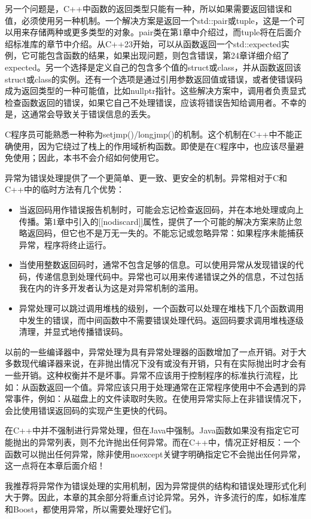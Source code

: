 另一个问题是，C++中函数的返回类型只能有一种，所以如果需要返回错误和值，必须使用另一种机制。一个解决方案是返回一个std::pair或tuple，这是一个可以用来存储两种或更多类型的对象。pair类在第1章中介绍过，而tuple将在后面介绍标准库的章节中介绍。从C++23开始，可以从函数返回一个std::expected实例，它可能包含函数的结果，如果出现问题，则包含错误，第24章详细介绍了expected。另一个选择是定义自己的包含多个值的struct或class，并从函数返回该struct或class的实例。还有一个选项是通过引用参数返回值或错误，或者使错误码成为返回类型的一种可能值，比如nullptr指针。这些解决方案中，调用者负责显式检查函数返回的错误，如果它自己不处理错误，应该将错误告知给调用者。不幸的是，这通常会导致关于错误信息的丢失。

C程序员可能熟悉一种称为setjmp()/longjmp()的机制。这个机制在C++中不能正确使用，因为它绕过了栈上的作用域析构函数。即使是在C程序中，也应该尽量避免使用；因此，本书不会介绍如何使用它。

异常为错误处理提供了一个更简单、更一致、更安全的机制。异常相对于C和C++中的临时方法有几个优势：

\begin{itemize}
\item
当返回码用作错误报告机制时，可能会忘记检查返回码，并在本地处理或向上传播。第1章中引入的[[nodiscard]]属性，提供了一个可能的解决方案来防止忽略返回码，但它也不是万无一失的。不能忘记或忽略异常：如果程序未能捕获异常，程序将终止运行。

\item
当使用整数返回码时，通常不包含足够的信息。可以使用异常从发现错误的代码，传递信息到处理代码中。异常也可以用来传递错误之外的信息，不过包括我在内的许多开发者认为这是对异常机制的滥用。

\item
异常处理可以跳过调用堆栈的级别，一个函数可以处理在堆栈下几个函数调用中发生的错误，而中间函数中不需要错误处理代码。返回码要求调用堆栈逐级清理，并显式地传播错误码。
\end{itemize}

以前的一些编译器中，异常处理为具有异常处理器的函数增加了一点开销。对于大多数现代编译器来说，在非抛出情况下没有或没有开销，只有在实际抛出时才会有一些开销。这种权衡并不是坏事。异常不应该用于控制程序的标准执行流程，比如：从函数返回一个值。异常应该只用于处理通常在正常程序使用中不会遇到的异常事件，例如：从磁盘上的文件读取时失败。在使用异常实际上在非错误情况下，会比使用错误返回码的实现产生更快的代码。

在C++中并不强制进行异常处理，但在Java中强制。Java函数如果没有指定它可能抛出的异常列表，则不允许抛出任何异常。而在C++中，情况正好相反：一个函数可以抛出任何异常，除非使用noexcept关键字明确指定它不会抛出任何异常，这一点将在本章后面介绍！


我推荐将异常作为错误处理的实用机制，因为异常提供的结构和错误处理形式化利大于弊。因此，本章的其余部分将重点讨论异常。另外，许多流行的库，如标准库和Boost，都使用异常，所以需要处理好它们。








